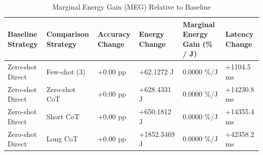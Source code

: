 \begin{table}
\caption{Marginal Energy Gain (MEG) Relative to Baseline}
\label{tab:marginal_energy_gain}
\begin{tabular}{llllll}
\toprule
Baseline Strategy & Comparison Strategy & Accuracy Change & Energy Change & Marginal Energy Gain (\% / J) & Latency Change \\
\midrule
Zero-shot Direct & Few-shot (3) & +0.00 pp & +62.1272 J & 0.0000 \%/J & +1104.5 ms \\
Zero-shot Direct & Zero-shot CoT & +0.00 pp & +628.4331 J & 0.0000 \%/J & +14230.8 ms \\
Zero-shot Direct & Short CoT & +0.00 pp & +650.1812 J & 0.0000 \%/J & +14355.4 ms \\
Zero-shot Direct & Long CoT & +0.00 pp & +1852.3469 J & 0.0000 \%/J & +42358.2 ms \\
\bottomrule
\end{tabular}
\end{table}
